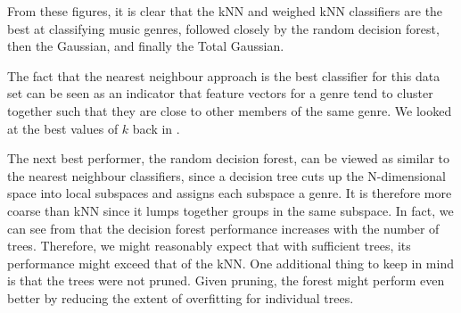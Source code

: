 \documentclass[journal,hidelinks]{IEEEtran}
\begin{document}
\begin{table}[!htb]
	\centering
	\caption{Cross-validation results for the implemented music classifiers.}
	\label{tab:results}
\end{table}

From these figures, it is clear that the kNN and weighed kNN classifiers are the best at classifying music genres, followed closely by the random decision forest, then the Gaussian, and finally the Total Gaussian.

The fact that the nearest neighbour approach is the best classifier for this data set can be seen as an indicator that feature vectors for a genre tend to cluster together such that they are close to other members of the same genre. We looked at the best values of $k$ back in .

The next best performer, the random decision forest, can be viewed as similar to the nearest neighbour classifiers, since a decision tree cuts up the N-dimensional space into local subspaces and assigns each subspace a genre. It is therefore more coarse than kNN since it lumps together groups in the same subspace. In fact, we can see from  that the decision forest performance increases with the number of trees. Therefore, we might reasonably expect that with sufficient trees, its performance might exceed that of the kNN. One additional thing to keep in mind is that the trees were not pruned. Given pruning, the forest might perform even better by reducing the extent of overfitting for individual trees.
\end{document}
